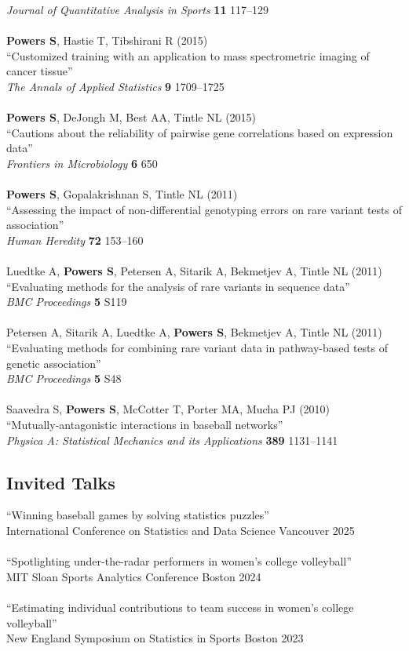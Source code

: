 \documentclass{article}
\begin{document}
{\it Journal of Quantitative Analysis in Sports} {\bf 11} 117--129\\
~\\
{\bf Powers S}, Hastie T, Tibshirani R (2015)\\
``Customized training with an application to mass spectrometric imaging of cancer tissue''\\
{\it The Annals of Applied Statistics} {\bf 9} 1709--1725\\
~\\
{\bf Powers S}, DeJongh M, Best AA, Tintle NL (2015)\\
``Cautions about the reliability of pairwise gene correlations based on expression data''\\
{\it Frontiers in Microbiology} {\bf 6} 650\\
~\\
{\bf Powers S}, Gopalakrishnan S, Tintle NL (2011)\\
``Assessing the impact of non-differential genotyping errors on rare variant tests of association''\\
{\it Human Heredity} {\bf 72} 153--160\\
~\\
Luedtke A, {\bf Powers S}, Petersen A, Sitarik A, Bekmetjev A, Tintle NL (2011)\\
``Evaluating methods for the analysis of rare variants in sequence data''\\
{\it BMC Proceedings} {\bf 5} S119\\
~\\
Petersen A, Sitarik A, Luedtke A, {\bf Powers S}, Bekmetjev A, Tintle NL (2011)\\
``Evaluating methods for combining rare variant data in pathway-based tests of genetic association''\\
{\it BMC Proceedings} {\bf 5} S48\\
~\\
Saavedra S, {\bf Powers S}, McCotter T, Porter MA, Mucha PJ (2010)\\
``Mutually-antagonistic interactions in baseball networks''\\
{\it Physica A: Statistical Mechanics and its Applications} {\bf 389} 1131--1141

\subsection*{\sc Invited Talks}

``Winning baseball games by solving statistics puzzles''\\
International Conference on Statistics and Data Science \hfill Vancouver 2025\\
~\\
``Spotlighting under-the-radar performers in women's college volleyball''\\
MIT Sloan Sports Analytics Conference \hfill Boston 2024\\
~\\
``Estimating individual contributions to team success in women's college volleyball''\\
New England Symposium on Statistics in Sports \hfill Boston 2023
\end{document}
